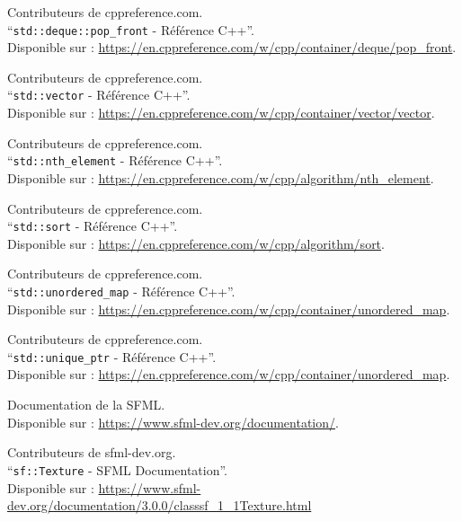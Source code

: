 \documentclass[a4paper,12pt]{report}
\begin{document}
\begin{thebibliography}{9}
        Contributeurs de cppreference.com.\\
        ``\texttt{std::deque::pop\_front} - Référence C++''.\\
        Disponible sur : \url{https://en.cppreference.com/w/cpp/container/deque/pop_front}.

        Contributeurs de cppreference.com.\\
        ``\texttt{std::vector} - Référence C++''.\\
        Disponible sur : \url{https://en.cppreference.com/w/cpp/container/vector/vector}.

        Contributeurs de cppreference.com.\\
        ``\texttt{std::nth\_element} - Référence C++''.\\
        Disponible sur : \url{https://en.cppreference.com/w/cpp/algorithm/nth_element}.

        Contributeurs de cppreference.com.\\
        ``\texttt{std::sort} - Référence C++''.\\
        Disponible sur : \url{https://en.cppreference.com/w/cpp/algorithm/sort}.

        Contributeurs de cppreference.com.\\
        ``\texttt{std::unordered\_map} - Référence C++''.\\
        Disponible sur : \url{https://en.cppreference.com/w/cpp/container/unordered_map}.

        Contributeurs de cppreference.com.\\
        ``\texttt{std::unique\_ptr} - Référence C++''.\\
        Disponible sur : \url{https://en.cppreference.com/w/cpp/container/unordered_map}.

        Documentation de la SFML. \\
        Disponible sur : \url{https://www.sfml-dev.org/documentation/}.

        Contributeurs de sfml-dev.org.\\
        ``\texttt{sf::Texture} - SFML Documentation''.\\
        Disponible sur : \url{https://www.sfml-dev.org/documentation/3.0.0/classsf_1_1Texture.html}


\end{thebibliography}
\end{document}
